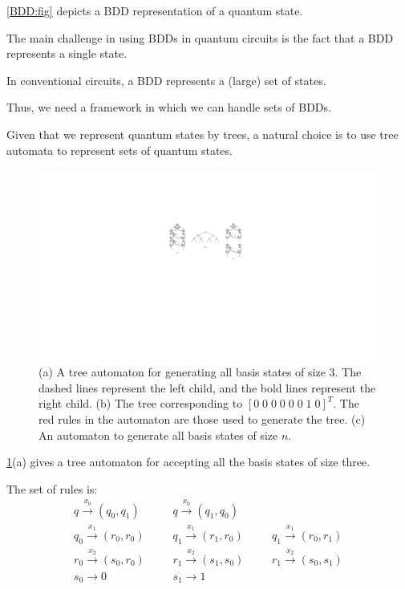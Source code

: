 \cref{BDD:fig} depicts a BDD representation of a quantum state.

The main challenge in using BDDs in quantum circuits is the fact that a BDD represents a single state.

In conventional circuits, a BDD represents a (large) set of states.

Thus, we need a framework in which we can handle sets of BDDs.

Given that we represent quantum states by trees, a natural choice is to use tree automata to represent sets of quantum states.


\begin{figure}[ht] 
    \centering
    \includegraphics[scale=0.8]{Figures/Automata/aut3} 
    \caption{(a) A tree automaton for generating all basis states of size $3$.
      The dashed lines represent the left child, and the bold lines represent the right child.
      (b) The tree corresponding to $[0\;0\;0\;0\;0\;0\;1\;0]^T$. The red rules in the automaton are those used to generate the tree.
      (c) An automaton to generate all basis states of size $n$.}
    \label{automata:fig}
\end{figure}


\cref{automata:fig}(a) gives a tree automaton for accepting all the basis states of size three.

The set of rules is:
\[
\begin{array}{lll}
q \xrightarrow{x_0} (q_0, q_1) &
\;\;\;\;\;\; q \xrightarrow{x_0} (q_1, q_0) & \\
q_0 \xrightarrow{x_1} (r_0, r_0) &
\;\;\;\;\;\; q_1 \xrightarrow{x_1} (r_1, r_0) &
\;\;\;\;\;\; q_1 \xrightarrow{x_1} (r_0, r_1) \\
r_0 \xrightarrow{x_2} (s_0, r_0) &
\;\;\;\;\;\; r_1 \xrightarrow{x_2} (s_1, s_0) &
\;\;\;\;\;\; r_1 \xrightarrow{x_2} (s_0, s_1) \\
s_0 \xrightarrow{} 0 &
\;\;\;\;\;\; s_1 \xrightarrow{} 1
\end{array}
\]


